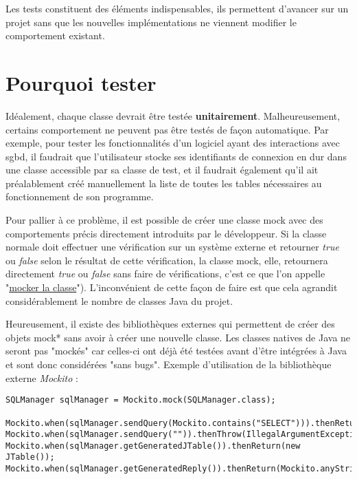 Les tests constituent des éléments indispensables, ils permettent d'avancer sur un projet sans que les nouvelles implémentations ne viennent modifier le comportement existant.
\section{Pourquoi tester}


Idéalement, chaque classe devrait être testée \textbf{unitairement}.
Malheureusement, certains comportement ne peuvent pas être testés  de façon automatique. Par exemple, pour tester les fonctionnalités d'un logiciel ayant des interactions avec \gls{sgbd}, il faudrait que l'utilisateur stocke ses identifiants de connexion en dur dans une classe accessible par sa classe de test, et il faudrait également qu'il ait préalablement créé manuellement la liste de toutes les tables nécessaires au fonctionnement de son programme.
\bigbreak

Pour pallier à ce problème, il est possible de créer une classe mock avec des comportements précis directement introduits par le développeur. Si la classe normale doit effectuer une vérification sur un système externe et retourner \textit{true} ou \textit{false} selon le résultat de cette vérification, la classe mock, elle, retournera directement \textit{true} ou \textit{false} sans faire de vérifications, c'est ce que l'on appelle "\underline{mocker la classe}"). L'inconvénient de cette façon de faire est que cela agrandit considérablement le nombre de classes Java du projet.


\bigbreak
  Heureusement, il existe des bibliothèques externes qui permettent de créer des objets \gls{mock}* sans avoir à créer une nouvelle classe.
Les classes natives de Java ne seront pas "mockés" car celles-ci ont déjà été testées avant d'être intégrées à Java et sont donc considérées "sans bugs".
\bigbreak
Exemple d'utilisation de la bibliothèque externe \textit{Mockito} :

\begin{lstlisting}
SQLManager sqlManager = Mockito.mock(SQLManager.class);

Mockito.when(sqlManager.sendQuery(Mockito.contains("SELECT"))).thenReturn(true);
Mockito.when(sqlManager.sendQuery("")).thenThrow(IllegalArgumentException.class);
Mockito.when(sqlManager.getGeneratedJTable()).thenReturn(new JTable());
Mockito.when(sqlManager.getGeneratedReply()).thenReturn(Mockito.anyString());

\end{lstlisting}
\bigbreak

